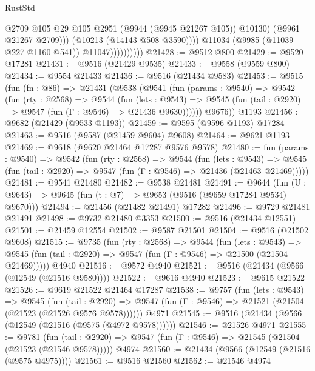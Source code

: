 \begin{lexlean}{RustStd}
\begin{coremodule}
                                  @2709
                                  @105
                                  @29
                                  @105
                                  @2951
                                  (@9944 (@9945 @21267 @105))
                                  @10130)
                                (@9961 @21267 @2709)))
                            (@10213 (@14143 @508 @3590))))
                        @11034
                        (@9985 (@11039 @227 @1160 @541))
                        @11047))))))))))
@21428 := @9512 @800
@21429 := @9520 @17281
@21431 := @9516 (@21429 @9535)
@21433 := @9558 (@9559 @800)
@21434 := @9554 @21433
@21436 := @9516 (@21434 @9583)
@21453 := @9515
    (fun (fn : @86) =>
    @21431
      (@9538
        (@9541
          (fun (params : @9540) =>
          @9542
            (fun (rty : @2568) =>
            @9544
              (fun (lets : @9543) =>
              @9545 (fun (tail : @2920) => @9547 (fun (Γ : @9546) => @21436 @9630))))))
        @9676))
    @1193
@21456 := @9682 (@21429 (@9533 @1193))
@21459 := @9595 (@9596 @1193) @17284
@21463 := @9516 (@9587 (@21459 @9604) @9608)
@21464 := @9621 @1193
@21469 := @9618 (@9620 @21464 @17287 @9576 @9578)
@21480 := fun (params : @9540) =>
  @9542
    (fun (rty : @2568) =>
    @9544
      (fun (lets : @9543) =>
      @9545 (fun (tail : @2920) => @9547 (fun (Γ : @9546) => @21436 (@21463 @21469)))))
@21481 := @9541 @21480
@21482 := @9538 @21481
@21491 := @9644
    (fun (U : @9643) => @9645 (fun (t : @7) => @9653 (@9516 (@9659 @17284 @9534) @9670)))
@21494 := @21456 (@21482 @21491) @17282
@21496 := @9729 @21481 @21491
@21498 := @9732 @21480 @3353
@21500 := @9516 (@21434 @12551)
@21501 := @21459 @12554
@21502 := @9587 @21501
@21504 := @9516 (@21502 @9608)
@21515 := @9735
    (fun (rty : @2568) =>
    @9544
      (fun (lets : @9543) =>
      @9545 (fun (tail : @2920) => @9547 (fun (Γ : @9546) => @21500 (@21504 @21469)))))
    @4940
@21516 := @9572 @4940
@21521 := @9516 (@21434 (@9566 (@12549 (@21516 @9580))))
@21522 := @9616 @4940
@21523 := @9615 @21522
@21526 := @9619 @21522 @21464 @17287
@21538 := @9757
    (fun (lets : @9543) =>
    @9545
      (fun (tail : @2920) =>
      @9547 (fun (Γ : @9546) => @21521 (@21504 (@21523 (@21526 @9576 @9578))))))
    @4971
@21545 := @9516 (@21434 (@9566 (@12549 (@21516 (@9575 (@4972 @9578))))))
@21546 := @21526 @4971
@21555 := @9781
    (fun (tail : @2920) => @9547 (fun (Γ : @9546) => @21545 (@21504 (@21523 (@21546 @9578)))))
    @4974
@21560 := @21434 (@9566 (@12549 (@21516 (@9575 @4975))))
@21561 := @9516 @21560
@21562 := @21546 @4974

\end{coremodule}
\end{lexlean}
